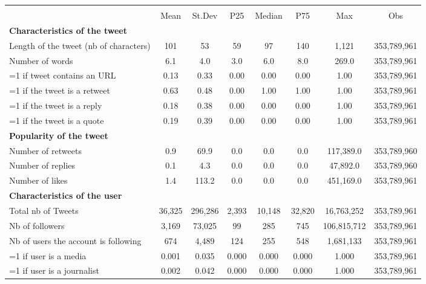 {
\def\sym#1{\ifmmode^{#1}\else\(^{#1}\)\fi}
\begin{tabular}{l*{1}{ccccccc}}
\hline\hline
                    &\multicolumn{7}{c}{}                                                                      \\
                    &        Mean&      St.Dev&         P25&      Median&         P75&         Max&         Obs\\
\hline
\textbf{Characteristics of the tweet}&            &            &            &            &            &            &            \\
Length of the tweet (nb of characters)&         101&          53&          59&          97&         140&       1,121& 353,789,961\\
Number of words     &         6.1&         4.0&         3.0&         6.0&         8.0&       269.0& 353,789,961\\
=1 if tweet contains an URL&        0.13&        0.33&        0.00&        0.00&        0.00&        1.00& 353,789,961\\
=1 if the tweet is a retweet&        0.63&        0.48&        0.00&        1.00&        1.00&        1.00& 353,789,961\\
=1 if the tweet is a reply&        0.18&        0.38&        0.00&        0.00&        0.00&        1.00& 353,789,961\\
=1 if the tweet is a quote&        0.19&        0.39&        0.00&        0.00&        0.00&        1.00& 353,789,961\\
\textbf{Popularity of the tweet}&            &            &            &            &            &            &            \\
Number of retweets  &         0.9&        69.9&         0.0&         0.0&         0.0&   117,389.0& 353,789,960\\
Number of replies   &         0.1&         4.3&         0.0&         0.0&         0.0&    47,892.0& 353,789,960\\
Number of likes     &         1.4&       113.2&         0.0&         0.0&         0.0&   451,169.0& 353,789,961\\
\textbf{Characteristics of the user}&            &            &            &            &            &            &            \\
Total nb of Tweets  &      36,325&     296,286&       2,393&      10,148&      32,820&  16,763,252& 353,789,961\\
Nb of followers     &       3,169&      73,025&          99&         285&         745& 106,815,712& 353,789,961\\
Nb of users the account is following&         674&       4,489&         124&         255&         548&   1,681,133& 353,789,961\\
=1 if user is a media&       0.001&       0.035&       0.000&       0.000&       0.000&       1.000& 353,789,961\\
=1 if user is a journalist&       0.002&       0.042&       0.000&       0.000&       0.000&       1.000& 353,789,961\\
\hline\hline
\end{tabular}
}
